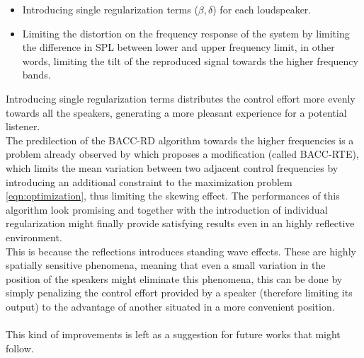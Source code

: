 \begin{itemize}
\item Introducing single regularization terms ($\beta, \delta$) for each loudspeaker.
\item Limiting the distortion on the frequency response of the system by limiting the difference in SPL between lower and upper frequency limit, in other words, limiting the tilt of the reproduced signal towards the higher frequency bands.
\end{itemize}

Introducing single regularization terms distributes the control effort more evenly towards all the speakers, generating a more pleasant experience for a potential listener.
\\
The predilection of the BACC-RD algorithm towards the higher frequencies is a problem already observed by \parencite{schellekens_time_2016} which proposes a modification (called BACC-RTE), which limits the mean variation between two adjacent control frequencies by introducing an additional constraint to the maximization problem \ref{eqn:optimization}, thus limiting the skewing effect. The performances of this algorithm look promising and together with the introduction of individual regularization might finally provide satisfying results even in an highly reflective environment.
\\
This is because the reflections introduces standing wave effects. 
These are highly spatially sensitive phenomena, meaning that even a small variation in the position of the speakers might eliminate this phenomena, this can be done by simply penalizing the control effort provided by a speaker (therefore limiting its output) to the advantage of another situated in a more convenient position.
\\
\\
This kind of improvements is left as a suggestion for future works that might follow.